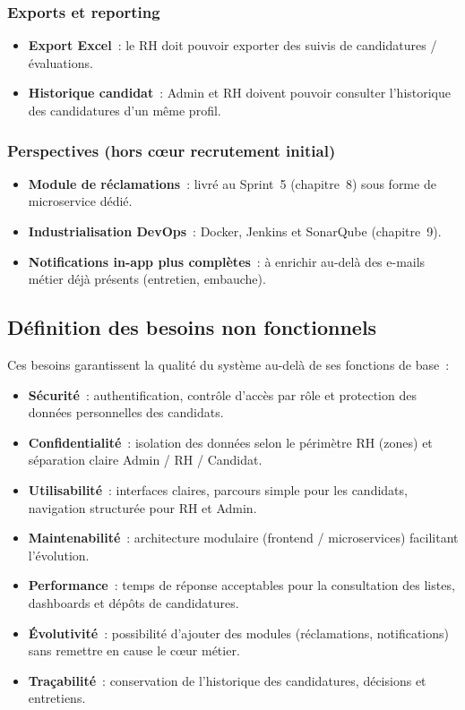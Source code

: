\subsubsection{Exports et reporting}

\begin{itemize}
  \item \textbf{Export Excel}~: le RH doit pouvoir exporter des suivis de
        candidatures / évaluations.
  \item \textbf{Historique candidat}~: Admin et RH doivent pouvoir consulter
        l'historique des candidatures d'un même profil.
\end{itemize}


\subsubsection{Perspectives (hors cœur recrutement initial)}

\begin{itemize}
  \item \textbf{Module de réclamations}~: livré au Sprint~5 (chapitre~8) sous
        forme de microservice dédié.
  \item \textbf{Industrialisation DevOps}~: Docker, Jenkins et SonarQube
        (chapitre~9).
  \item \textbf{Notifications in-app plus complètes}~: à enrichir au-delà des
        e-mails métier déjà présents (entretien, embauche).
\end{itemize}


\subsection{Définition des besoins non fonctionnels}

Ces besoins garantissent la qualité du système au-delà de ses fonctions de base~:

\begin{itemize}
  \item \textbf{Sécurité}~: authentification, contrôle d'accès par rôle et
        protection des données personnelles des candidats.
  \item \textbf{Confidentialité}~: isolation des données selon le périmètre RH
        (zones) et séparation claire Admin / RH / Candidat.
  \item \textbf{Utilisabilité}~: interfaces claires, parcours simple pour les
        candidats, navigation structurée pour RH et Admin.
  \item \textbf{Maintenabilité}~: architecture modulaire (frontend / microservices)
        facilitant l'évolution.
  \item \textbf{Performance}~: temps de réponse acceptables pour la consultation
        des listes, dashboards et dépôts de candidatures.
  \item \textbf{Évolutivité}~: possibilité d'ajouter des modules (réclamations,
        notifications) sans remettre en cause le cœur métier.
  \item \textbf{Traçabilité}~: conservation de l'historique des candidatures,
        décisions et entretiens.
\end{itemize}


